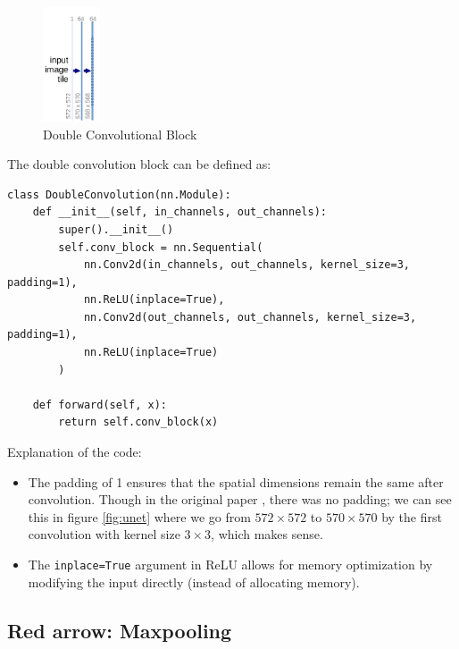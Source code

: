 \documentclass{article}
\begin{document}
\begin{figure}[H]
    \centering
    \includegraphics[width=0.15\textwidth]{latex/blue_arrow.png}
    \caption{Double Convolutional Block}
\end{figure}

The double convolution block can be defined as:

\begin{verbatim}
class DoubleConvolution(nn.Module):
    def __init__(self, in_channels, out_channels):
        super().__init__()
        self.conv_block = nn.Sequential(
            nn.Conv2d(in_channels, out_channels, kernel_size=3, padding=1),
            nn.ReLU(inplace=True),
            nn.Conv2d(out_channels, out_channels, kernel_size=3, padding=1),
            nn.ReLU(inplace=True)
        )
    
    def forward(self, x):
        return self.conv_block(x)
\end{verbatim}

Explanation of the code:

\begin{itemize}
    \item The padding of 1 ensures that the spatial dimensions remain the same after convolution. Though in the original paper \cite{unet}, there was no padding; we can see this in figure \ref{fig:unet} where we go from $572 \times 572$ to $570 \times 570$ by the first convolution with kernel size $3 \times 3$, which makes sense.
    
    \item The \texttt{inplace=True} argument in ReLU allows for memory optimization by modifying the input directly (instead of allocating memory).
\end{itemize}







\subsection{Red arrow: Maxpooling}
\end{document}
